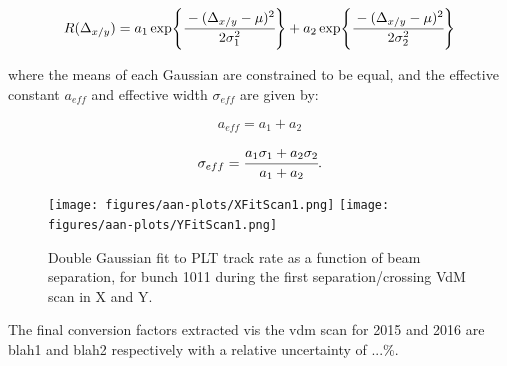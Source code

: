 
$$
R(\Delta_{x/y}) = a_{1}\exp{\cfrac{-(\Delta_{x/y} - \mu)^{2}}{2\sigma^{2}_{1}}} + a_{2}\exp{\cfrac{-(\Delta_{x/y} - \mu)^{2}}{2\sigma^{2}_{2}}}
 $$

where the means of each Gaussian are constrained to be equal, and the effective constant $a_{eff}$ and effective width $\sigma_{eff}$ are given by:

$$a_{eff} = a_{1} + a_{2}$$

$$\sigma_{eff} = \cfrac{a_{1}\sigma_{1} + a_{2}\sigma_{2}}{a_{1} + a_{2}}.$$


\begin{figure}[htp]
\begin{center}
\texttt{[image: figures/aan-plots/XFitScan1.png]}
\texttt{[image: figures/aan-plots/YFitScan1.png]}
\caption{Double Gaussian fit to PLT track rate as a function of beam separation, for bunch 1011 during the first separation/crossing VdM scan in X and Y.
\label{fig:Scan1Fits}}
\end{center}
\end{figure}

The final conversion factors extracted vis the vdm scan for 2015 and 2016 are blah1 and blah2 respectively with a relative uncertainty of ...\%.